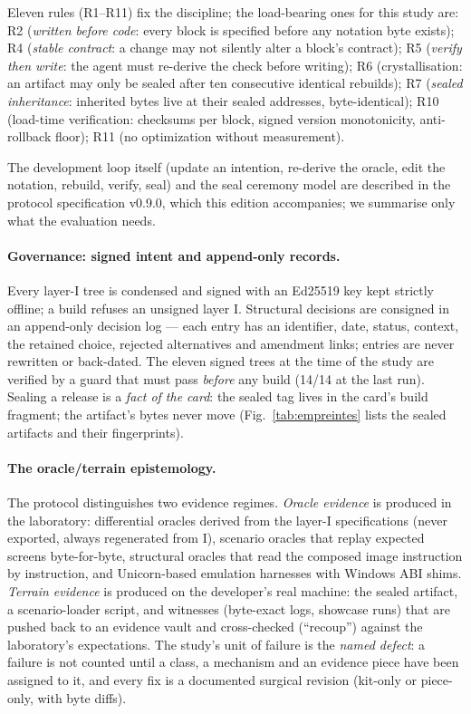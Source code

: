 \documentclass[11pt,a4paper]{article}
\begin{document}
Eleven rules (R1--R11) fix the discipline; the load-bearing ones for this
study are: R2 (\emph{written before code}: every block is specified before
any notation byte exists); R4 (\emph{stable contract}: a change may not
silently alter a block's contract); R5 (\emph{verify then write}: the
agent must re-derive the check before writing); R6 (crystallisation: an
artifact may only be sealed after ten consecutive identical rebuilds);
R7 (\emph{sealed inheritance}: inherited bytes live at their sealed
addresses, byte-identical); R10 (load-time verification: checksums per
block, signed version monotonicity, anti-rollback floor); R11 (no
optimization without measurement).

The development loop itself (update an intention, re-derive the oracle,
edit the notation, rebuild, verify, seal) and the seal ceremony model are
described in the protocol specification v0.9.0, which this edition
accompanies; we summarise only what the evaluation needs.

\paragraph{Governance: signed intent and append-only records.}
Every layer-I tree is condensed and signed with an Ed25519 key kept
strictly offline; a build refuses an unsigned layer I. Structural
decisions are consigned in an append-only decision log --- each entry has
an identifier, date, status, context, the retained choice, rejected
alternatives and amendment links; entries are never rewritten or
back-dated. The eleven signed trees at the time of the study are verified
by a guard that must pass \emph{before} any build (14/14 at the last
run). Sealing a release is a \emph{fact of the card}: the sealed tag
lives in the card's build fragment; the artifact's bytes never move
(Fig.~\ref{tab:empreintes} lists the sealed artifacts and their
fingerprints).

\paragraph{The oracle/terrain epistemology.}
The protocol distinguishes two evidence regimes. \emph{Oracle evidence} is
produced in the laboratory: differential oracles derived from the layer-I
specifications (never exported, always regenerated from I), scenario
oracles that replay expected screens byte-for-byte, structural oracles
that read the composed image instruction by instruction, and Unicorn-based
emulation harnesses with Windows ABI shims. \emph{Terrain evidence} is
produced on the developer's real machine: the sealed artifact, a
scenario-loader script, and witnesses (byte-exact logs, showcase runs)
that are pushed back to an evidence vault and cross-checked (``recoup'')
against the laboratory's expectations. The study's unit of failure is the
\emph{named defect}: a failure is not counted until a class, a mechanism
and an evidence piece have been assigned to it, and every fix is a
documented surgical revision (kit-only or piece-only, with byte diffs).
\end{document}
